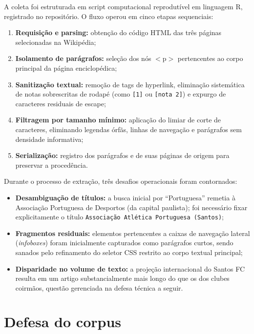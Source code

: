 \documentclass[
  article,
  12pt,
  oneside,
  a4paper,
  english,
  brazil
]{abntex2}\usepackage[]{graphicx}\usepackage[]{xcolor}
\begin{document}
A coleta foi estruturada em script computacional reprodutível em linguagem R, registrado no repositório. O fluxo operou em cinco etapas sequenciais:
\begin{enumerate}
  \item \textbf{Requisição e parsing:} obtenção do código HTML das três páginas selecionadas na Wikipédia;
  \item \textbf{Isolamento de parágrafos:} seleção dos nós $<\!\text{p}\!>$ pertencentes ao corpo principal da página enciclopédica;
  \item \textbf{Sanitização textual:} remoção de tags de hyperlink, eliminação sistemática de notas sobrescritas de rodapé (como \texttt{[1]} ou \texttt{[nota 2]}) e expurgo de caracteres residuais de escape;
  \item \textbf{Filtragem por tamanho mínimo:} aplicação do limiar de corte de  caracteres, eliminando legendas órfãs, linhas de navegação e parágrafos sem densidade informativa;
  \item \textbf{Serialização:} registro dos parágrafos e de suas páginas de origem para preservar a procedência.
\end{enumerate}

Durante o processo de extração, três desafios operacionais foram contornados:
\begin{itemize}
  \item \textbf{Desambiguação de títulos:} a busca inicial por ``Portuguesa'' remetia à Associação Portuguesa de Desportos (da capital paulista); foi necessário fixar explicitamente o título \texttt{Associação Atlética Portuguesa (Santos)};
  \item \textbf{Fragmentos residuais:} elementos pertencentes a caixas de navegação lateral (\emph{infoboxes}) foram inicialmente capturados como parágrafos curtos, sendo sanados pelo refinamento do seletor CSS restrito ao corpo textual principal;
  \item \textbf{Disparidade no volume de texto:} a projeção internacional do Santos FC resulta em um artigo substancialmente mais longo do que os dos clubes coirmãos, questão gerenciada na defesa técnica a seguir.
\end{itemize}

\section{Defesa do corpus}
\end{document}
